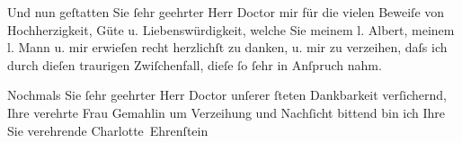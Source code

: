 \pstart
           Und nun geſtatten Sie{ }ſehr geehrter Herr Doctor mir für die vielen Beweiſe von
               Hochherzigkeit, Güte u. Liebenswürdigkeit, welche Sie meinem l. Albert, meinem l. Mann u. mir erwieſen recht herzlichſt zu danken, u. mir zu
               verzeihen, daſs ich durch dieſen traurigen Zwiſchenfall, dieſe{ }ſo{ }ſehr in Anſpruch
               nahm.\pend
           
\pstart
           {\pb}Nochmals Sie{ }ſehr geehrter Herr Doctor unſerer{ }ſteten
               Dankbarkeit verſichernd, Ihre verehrte Frau Gemahlin um Verzeihung und Nachſicht bittend bin ich Ihre
               Sie verehrende\pend
           \pstart \spacefill\mbox{Charlotte Ehrenſtein}\pend{}\endnumbering{}  \newcommand{\dateiname}{L01576}\newcommand{\titel}{Charlotte Ehrenstein an Arthur Schnitzler, [22. 1.? 1906]}\newcommand{\editorInnen}{Martin Anton Müller und Gerd-Hermann Susen}
